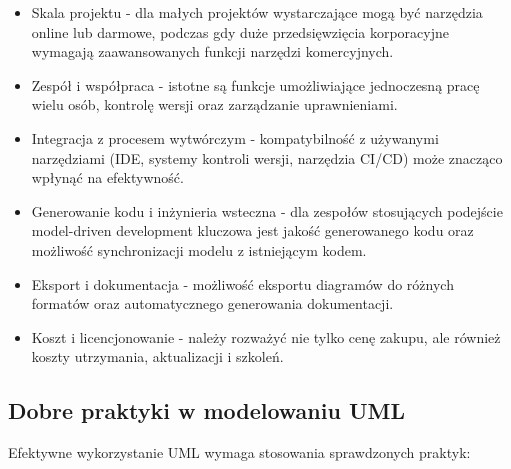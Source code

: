 \documentclass[12pt,a4paper]{article}
\begin{document}
\begin{itemize}
    \item Skala projektu - dla małych projektów wystarczające mogą być narzędzia online lub darmowe, podczas gdy duże przedsięwzięcia korporacyjne wymagają zaawansowanych funkcji narzędzi komercyjnych.
    
    \item Zespół i współpraca - istotne są funkcje umożliwiające jednoczesną pracę wielu osób, kontrolę wersji oraz zarządzanie uprawnieniami.
    
    \item Integracja z procesem wytwórczym - kompatybilność z używanymi narzędziami (IDE, systemy kontroli wersji, narzędzia CI/CD) może znacząco wpłynąć na efektywność.
    
    \item Generowanie kodu i inżynieria wsteczna - dla zespołów stosujących podejście model-driven development kluczowa jest jakość generowanego kodu oraz możliwość synchronizacji modelu z istniejącym kodem.
    
    \item Eksport i dokumentacja - możliwość eksportu diagramów do różnych formatów oraz automatycznego generowania dokumentacji.
    
    \item Koszt i licencjonowanie - należy rozważyć nie tylko cenę zakupu, ale również koszty utrzymania, aktualizacji i szkoleń.
\end{itemize}

\subsection{Dobre praktyki w modelowaniu UML}
Efektywne wykorzystanie UML wymaga stosowania sprawdzonych praktyk:
\end{document}

